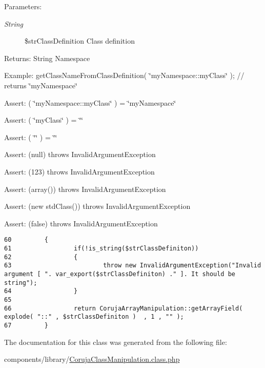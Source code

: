 \begin{Desc}
\item[Parameters:]
\begin{description}
\item[{\em String}]\$strClassDefinition Class definition \end{description}
\end{Desc}
\begin{Desc}
\item[Returns:]String Namespace \end{Desc}
\begin{Desc}
\item[Example:]getClassNameFromClassDefinition( \char`\"{}myNamespace::myClass\char`\"{} ); // returns \char`\"{}myNamespace\char`\"{}\end{Desc}
\begin{Desc}
\item[Assert:]( \char`\"{}myNamespace::myClass\char`\"{} ) = \char`\"{}myNamespace\char`\"{} \end{Desc}
\begin{Desc}
\item[Assert:]( \char`\"{}myClass\char`\"{} ) = \char`\"{}\char`\"{} \end{Desc}
\begin{Desc}
\item[Assert:]( \char`\"{}\char`\"{} ) = \char`\"{}\char`\"{}\end{Desc}
\begin{Desc}
\item[Assert:](null) throws InvalidArgumentException \end{Desc}
\begin{Desc}
\item[Assert:](123) throws InvalidArgumentException \end{Desc}
\begin{Desc}
\item[Assert:](array()) throws InvalidArgumentException \end{Desc}
\begin{Desc}
\item[Assert:](new stdClass()) throws InvalidArgumentException \end{Desc}
\begin{Desc}
\item[Assert:](false) throws InvalidArgumentException \end{Desc}


\begin{Code}\begin{verbatim}60         {
61                 if(!is_string($strClassDefiniton))
62                 {
63                         throw new InvalidArgumentException("Invalid argument [ ". var_export($strClassDefiniton) ." ]. It should be string");
64                 }
65 
66                 return CorujaArrayManipulation::getArrayField( explode( "::" , $strClassDefiniton )  , 1 , "" );
67         }
\end{verbatim}
\end{Code}




The documentation for this class was generated from the following file:\begin{CompactItemize}
\item 
components/library/\hyperlink{_coruja_class_manipulation_8class_8php}{CorujaClassManipulation.class.php}\end{CompactItemize}
